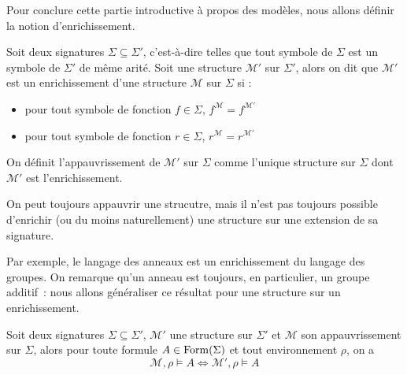 Pour conclure cette partie introductive à propos des modèles, nous allons
définir la notion d'enrichissement.

\begin{definition}[Enrichissement]
  Soit deux signatures $\Sigma\subseteq\Sigma'$, c'est-à-dire telles que tout
  symbole de $\Sigma$ est un symbole de $\Sigma'$ de même arité. Soit une
  structure $\mathcal M'$ sur $\Sigma'$, alors on dit que $\mathcal M'$ est un
  enrichissement d'une structure $\mathcal M$ sur $\Sigma$ si :
  \begin{itemize}
  \item pour tout symbole de fonction $f\in \Sigma$,
    $f^{\mathcal M} = f^{\mathcal M'}$
  \item pour tout symbole de fonction $r\in \Sigma$,
    $r^{\mathcal M} = r^{\mathcal M'}$
  \end{itemize}

  On définit l'appauvrissement de $\mathcal M'$ sur $\Sigma$ comme l'unique
  structure sur $\Sigma$ dont $\mathcal M'$ est l'enrichissement.
\end{definition}

\begin{remark}
  On peut toujours appauvrir une strucutre, mais il n'est pas toujours possible
  d'enrichir (ou du moins naturellement) une structure sur une extension de sa
  signature.
\end{remark}

Par exemple, le langage des anneaux est un enrichissement du langage des
groupes. On remarque qu'un anneau est toujours, en particulier, un groupe
additif~: nous allons généraliser ce résultat pour une structure sur un
enrichissement.

\begin{proposition}
  Soit deux signatures $\Sigma\subseteq\Sigma'$, $\mathcal M'$ une structure
  sur $\Sigma'$ et $\mathcal M$ son appauvrissement sur $\Sigma$, alors pour
  toute formule $A\in\operatorname{Form}(\Sigma)$ et tout environnement $\rho$, on a
  \[\mathcal M,\rho\models A \iff \mathcal M',\rho\models A\]
\end{proposition}

